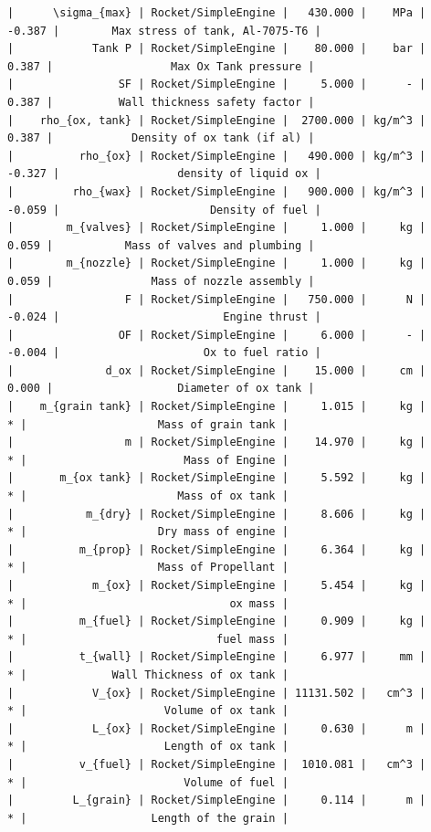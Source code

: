 \documentclass[12pt]{article}
\begin{document}
\begin{landscape}
\begin{verbatim}
|      \sigma_{max} | Rocket/SimpleEngine |   430.000 |    MPa | -0.387 |        Max stress of tank, Al-7075-T6 |
|            Tank P | Rocket/SimpleEngine |    80.000 |    bar |  0.387 |                  Max Ox Tank pressure |
|                SF | Rocket/SimpleEngine |     5.000 |      - |  0.387 |          Wall thickness safety factor |
|    rho_{ox, tank} | Rocket/SimpleEngine |  2700.000 | kg/m^3 |  0.387 |            Density of ox tank (if al) |
|          rho_{ox} | Rocket/SimpleEngine |   490.000 | kg/m^3 | -0.327 |                  density of liquid ox |
|         rho_{wax} | Rocket/SimpleEngine |   900.000 | kg/m^3 | -0.059 |                       Density of fuel |
|        m_{valves} | Rocket/SimpleEngine |     1.000 |     kg |  0.059 |           Mass of valves and plumbing |
|        m_{nozzle} | Rocket/SimpleEngine |     1.000 |     kg |  0.059 |               Mass of nozzle assembly |
|                 F | Rocket/SimpleEngine |   750.000 |      N | -0.024 |                         Engine thrust |
|                OF | Rocket/SimpleEngine |     6.000 |      - | -0.004 |                      Ox to fuel ratio |
|              d_ox | Rocket/SimpleEngine |    15.000 |     cm |  0.000 |                   Diameter of ox tank |
|    m_{grain tank} | Rocket/SimpleEngine |     1.015 |     kg |      * |                    Mass of grain tank |
|                 m | Rocket/SimpleEngine |    14.970 |     kg |      * |                        Mass of Engine |
|       m_{ox tank} | Rocket/SimpleEngine |     5.592 |     kg |      * |                       Mass of ox tank |
|           m_{dry} | Rocket/SimpleEngine |     8.606 |     kg |      * |                    Dry mass of engine |
|          m_{prop} | Rocket/SimpleEngine |     6.364 |     kg |      * |                    Mass of Propellant |
|            m_{ox} | Rocket/SimpleEngine |     5.454 |     kg |      * |                               ox mass |
|          m_{fuel} | Rocket/SimpleEngine |     0.909 |     kg |      * |                             fuel mass |
|          t_{wall} | Rocket/SimpleEngine |     6.977 |     mm |      * |             Wall Thickness of ox tank |
|            V_{ox} | Rocket/SimpleEngine | 11131.502 |   cm^3 |      * |                     Volume of ox tank |
|            L_{ox} | Rocket/SimpleEngine |     0.630 |      m |      * |                     Length of ox tank |
|          v_{fuel} | Rocket/SimpleEngine |  1010.081 |   cm^3 |      * |                        Volume of fuel |
|         L_{grain} | Rocket/SimpleEngine |     0.114 |      m |      * |                   Length of the grain |

\end{verbatim}
\end{landscape}
\end{document}
